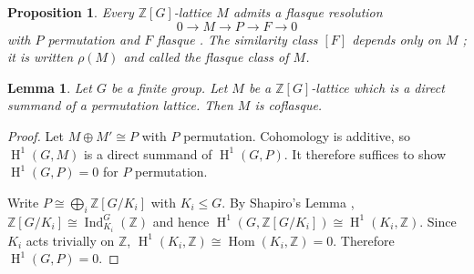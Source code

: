 \documentclass[12pt,a4paper]{article}
\newtheorem{lemma}[theorem]{Lemma}
\newtheorem{proposition}[theorem]{Proposition}
\theoremstyle{definition}
\DeclareMathOperator{\Hom}{Hom}
\DeclareMathOperator{\Ind}{Ind}
\DeclareMathOperator{\coh}{H}
\begin{document}
\begin{proposition}\label{prop:flasque-resolution}
Every \(\mathbb{Z}[G]\)-lattice \(M\) admits a \emph{flasque
resolution}
\[
0 \longrightarrow M \longrightarrow P \longrightarrow F
\longrightarrow 0
\]
with \(P\) permutation and \(F\) flasque \cite[\S1, Lemme~3]{CTS77}.
The similarity class \([F]\) depends only on \(M\)
\cite[\S1, Lemme~5]{CTS77}; it is written \(\rho(M)\) and called the
\emph{flasque class} of \(M\).
\end{proposition}

\begin{lemma}\label{lem:invertible-coflasque}
Let \(G\) be a finite group.  Let \(M\) be a \(\mathbb{Z}[G]\)-lattice
which is a direct summand of a permutation lattice.  Then \(M\) is
coflasque.
\end{lemma}
\begin{proof}
Let \(M \oplus M' \cong P\) with \(P\) permutation.  Cohomology is
additive, so \(\coh^1(G, M)\) is a direct summand of
\(\coh^1(G, P)\).  It therefore suffices to show
\(\coh^1(G, P) = 0\) for \(P\) permutation.

Write \(P \cong \bigoplus_i \mathbb{Z}[G/K_i]\) with \(K_i \le G\).
By Shapiro's Lemma \cite[Theorem~6.3.2]{Weibel1994},
\(\mathbb{Z}[G/K_i] \cong \Ind_{K_i}^G(\mathbb{Z})\) and hence
\(\coh^1(G, \mathbb{Z}[G/K_i]) \cong \coh^1(K_i, \mathbb{Z})\).
Since \(K_i\) acts trivially on \(\mathbb{Z}\),
\(\coh^1(K_i, \mathbb{Z}) \cong \Hom(K_i, \mathbb{Z}) = 0\).  Therefore
\(\coh^1(G, P) = 0\).
\end{proof}
\end{document}
